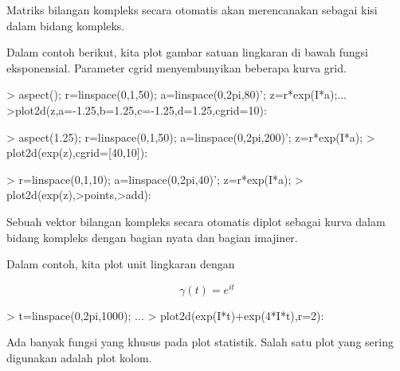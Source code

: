 \documentclass{report}
\begin{document}
\begin{eulernotebook}
\begin{eulercomment}
\begin{eulercomment}
\begin{eulercomment}
\begin{eulercomment}
\begin{eulercomment}
Matriks bilangan kompleks secara otomatis akan merencanakan sebagai
kisi dalam bidang kompleks.

Dalam contoh berikut, kita plot gambar satuan lingkaran di bawah
fungsi eksponensial. Parameter cgrid menyembunyikan beberapa kurva
grid.
\end{eulercomment}
\begin{eulerprompt}
> aspect(); r=linspace(0,1,50); a=linspace(0,2pi,80)'; z=r*exp(I*a);...
>plot2d(z,a=-1.25,b=1.25,c=-1.25,d=1.25,cgrid=10):
\end{eulerprompt}
\begin{eulerprompt}
> aspect(1.25); r=linspace(0,1,50); a=linspace(0,2pi,200)'; z=r*exp(I*a);
> plot2d(exp(z),cgrid=[40,10]):
\end{eulerprompt}
\begin{eulerprompt}
> r=linspace(0,1,10); a=linspace(0,2pi,40)'; z=r*exp(I*a);
> plot2d(exp(z),>points,>add):
\end{eulerprompt}
\begin{eulercomment}
Sebuah vektor bilangan kompleks secara otomatis diplot sebagai kurva
dalam bidang kompleks dengan bagian nyata dan bagian imajiner.

Dalam contoh, kita plot unit lingkaran dengan

\end{eulercomment}
\begin{eulerformula}
\[
\gamma(t) = e^{it}
\]
\end{eulerformula}
\begin{eulerprompt}
> t=linspace(0,2pi,1000); ...
> plot2d(exp(I*t)+exp(4*I*t),r=2):
\end{eulerprompt}
\begin{eulercomment}
Ada banyak fungsi yang khusus pada plot statistik. Salah satu plot
yang sering digunakan adalah plot kolom.


\end{eulercomment}
\end{eulercomment}
\end{eulercomment}
\end{eulercomment}
\end{eulercomment}
\end{eulernotebook}
\end{document}
